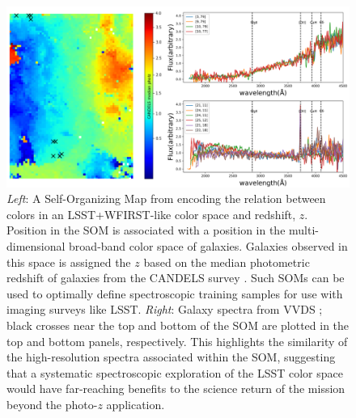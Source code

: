 \documentclass[oneside,11pt]{amsart}
\begin{document}
\begin{figure}[h!]
%
\vskip -0.2in
%
\includegraphics[width=\textwidth]{figs/Hemmati18_Fig8_VVDS_spec.png}
%
\caption{\small {\it Left}: A Self-Organizing Map
\citep[SOM;][]{1990Natur.346...24K} from \citet{hemmati18} encoding the
relation between colors in an LSST+WFIRST-like color space and redshift,
$z$.  Position in the SOM is associated with a position in the
multi-dimensional broad-band color space of galaxies.  Galaxies observed
in this space is assigned the $z$ based on the median photometric
redshift of galaxies from the CANDELS survey \citep[color
bar;][]{2011ApJS..197...35G}.  Such SOMs can be used to optimally define
spectroscopic training samples for use with imaging surveys like LSST.
{\it Right}: Galaxy spectra from VVDS \citep{2005A&A...439..845L}; black
crosses near the top and bottom of the SOM are plotted in the top and
bottom panels, respectively.  This highlights the similarity of the
high-resolution spectra associated within the SOM, suggesting that a
systematic spectroscopic exploration of the LSST color space would have
far-reaching benefits to the science return of the mission beyond the
photo-$z$ application.}
%
\label{fig:SOM}
%
\end{figure}

\end{document}
